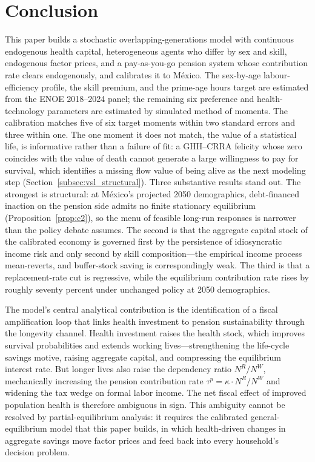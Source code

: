\documentclass[12pt,a4paper]{article}
\begin{document}
\section{Conclusion}
\label{sec:conclusion}

This paper builds a stochastic overlapping-generations model with continuous endogenous health capital, heterogeneous agents who differ by sex and skill, endogenous factor prices, and a pay-as-you-go pension system whose contribution rate clears endogenously, and calibrates it to M\'exico. The sex-by-age labour-efficiency profile, the skill premium, and the prime-age hours target are estimated from the ENOE 2018--2024 panel; the remaining six preference and health-technology parameters are estimated by simulated method of moments. The calibration matches five of six target moments within two standard errors and three within one. The one moment it does not match, the value of a statistical life, is informative rather than a failure of fit: a GHH--CRRA felicity whose zero coincides with the value of death cannot generate a large willingness to pay for survival, which identifies a missing flow value of being alive as the next modeling step (Section~\ref{subsec:vsl_structural}). Three substantive results stand out. The strongest is structural: at M\'exico's projected 2050 demographics, debt-financed inaction on the pension side admits no finite stationary equilibrium (Proposition~\ref{prop:c2}), so the menu of feasible long-run responses is narrower than the policy debate assumes. The second is that the aggregate capital stock of the calibrated economy is governed first by the persistence of idiosyncratic income risk and only second by skill composition---the empirical income process mean-reverts, and buffer-stock saving is correspondingly weak. The third is that a replacement-rate cut is regressive, while the equilibrium contribution rate rises by roughly seventy percent under unchanged policy at 2050 demographics.

The model's central analytical contribution is the identification of a fiscal amplification loop that links health investment to pension sustainability through the longevity channel. Health investment raises the health stock, which improves survival probabilities and extends working lives---strengthening the life-cycle savings motive, raising aggregate capital, and compressing the equilibrium interest rate. But longer lives also raise the dependency ratio $N^R/N^W$, mechanically increasing the pension contribution rate $\tau^p = \kappa \cdot N^R/N^W$ and widening the tax wedge on formal labor income. The net fiscal effect of improved population health is therefore ambiguous in sign. This ambiguity cannot be resolved by partial-equilibrium analysis: it requires the calibrated general-equilibrium model that this paper builds, in which health-driven changes in aggregate savings move factor prices and feed back into every household's decision problem.
\end{document}
